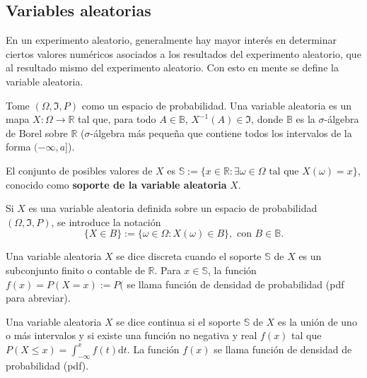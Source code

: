 	\subsection{Variables aleatorias}
	En un experimento aleatorio, generalmente hay mayor interés en determinar ciertos valores numéricos asociados a los resultados del experimento aleatorio, que al resultado mismo del experimento aleatorio. Con esto en mente se define la variable aleatoria.

	\begin{defi}
	Tome $(\Omega, \Im, P)$ como un espacio de probabilidad. Una variable aleatoria es un mapa $X:\Omega\rightarrow \mathbb{R}$ tal que, para todo $A\in\mathbb{B}$, $X^{-1}(A)\in\Im$, donde $\mathbb{B}$ es la $\sigma$-álgebra de Borel sobre $\mathbb{R}$ ($\sigma$-álgebra más pequeña que contiene todos los intervalos de la forma $(-\infty, a]$).
	
	El conjunto de posibles valores de $X$ es $\mathbb{S}:=\{x\in\mathbb{R}:\exists \omega\in\Omega\text{ tal que }X(\omega)=x\}$, conocido como \textbf{soporte de la variable aleatoria }$X$.
	\end{defi}
	Si $X$ es una variable aleatoria definida sobre un  espacio de probabilidad $(\Omega, \Im, P)$, se introduce la notación
	$$\{X\in B\}:=\{\omega\in\Omega: X(\omega)\in B\}, \text{ con }B\in\mathbb{B}.$$
	\begin{defi}
		Una variable aleatoria $X$ se dice discreta cuando el soporte $\mathbb{S}$ de $X$ es un subconjunto finito o contable de $\mathbb{R}$. Para $x\in\mathbb{S}$, la función $f(x)=P(X=x):=P($ se llama función de densidad de probabilidad (pdf para abreviar).
	\end{defi}
	
	\begin{defi}
		Una variable aleatoria $X$ se dice continua si el soporte $\mathbb{S}$ de $X$ es la unión de uno o más intervalos y si existe una función no negativa y real $f(x)$ tal que $P(X\leq x)=\int_{-\infty}^x f(t)\mathrm{d}t.$ La función $f(x)$ se llama función de densidad de probabilidad (pdf).
	\end{defi}
	
